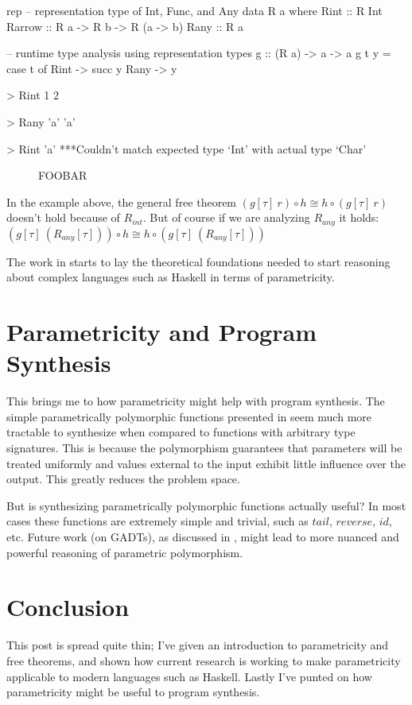 \begin{SaveVerbatim}{rep}
-- representation type of Int, Func, and Any
data R a where
  Rint :: R Int
  Rarrow :: R a -> R b -> R (a -> b)
  Rany :: R a

-- runtime type analysis using representation types
g :: (R a) -> a -> a
g t y = case t of
             Rint -> succ y
             Rany -> y

> Rint 1
2

> Rany 'a'
'a'

> Rint 'a'
***Couldn't match expected type `Int' with actual type `Char'
\end{SaveVerbatim}

\begin{figure}
  \caption{FOOBAR}
  \label{fig:rep}
\end{figure}

In the example above, the general free theorem $(g[\tau]\ r) \circ h \cong h \circ (g[\tau]\ r) $ doesn't hold because of $R_{int} $. But of course if we are analyzing $R_{any} $ it holds: $(g[\tau]\ (R_{any}[\tau])) \circ h \cong h \circ (g[\tau]\ (R_{any}[\tau])) $ \cite{vytinFree}

The work in \cite{vytinFree} starts to lay the theoretical foundations needed to start reasoning about complex languages such as Haskell in terms of parametricity.

\section{Parametricity and Program Synthesis}
This brings me to how parametricity might help with program synthesis. The simple parametrically polymorphic functions presented in \cite{theoremsForFree} seem much more tractable to synthesize when compared to functions with arbitrary type signatures. This is because the polymorphism guarantees that parameters will be treated uniformly and values external to the input exhibit little influence over the output. This greatly reduces the problem space.

But is synthesizing parametrically polymorphic functions actually useful? In most cases these functions are extremely simple and trivial, such as $tail$, $reverse$, $id$, etc. Future work (on GADTs), as discussed in \cite{vytinFree}, might lead to more nuanced and powerful reasoning of parametric polymorphism.

\section{Conclusion}
This post is spread quite thin; I've given an introduction to parametricity and free theorems, and shown how current research is working to make parametricity applicable to modern languages such as Haskell. Lastly I've punted on how parametricity might be useful to program synthesis.

